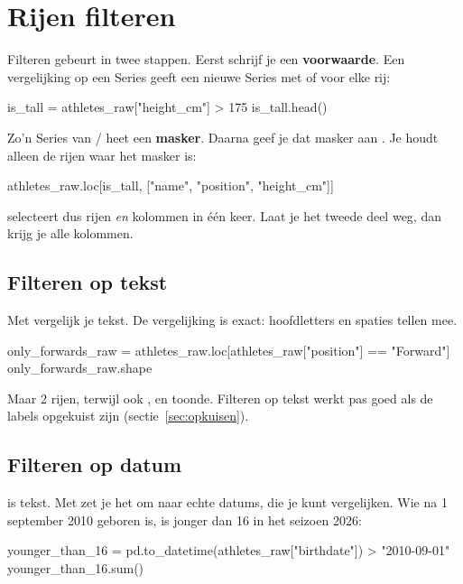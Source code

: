 \documentclass[11pt,a4paper]{article}
\begin{document}
\section{Rijen filteren}

Filteren gebeurt in twee stappen. Eerst schrijf je een
\textbf{voorwaarde}. Een vergelijking op een Series geeft een nieuwe
Series met  of  voor elke rij:

\begin{python}
is_tall = athletes_raw["height_cm"] > 175
is_tall.head()
\end{python}

Zo'n Series van / heet een \textbf{masker}. Daarna
geef je dat masker aan . Je houdt alleen de rijen waar
het masker  is:

\begin{python}
athletes_raw.loc[is_tall, ["name", "position", "height_cm"]]
\end{python}

 selecteert dus rijen \emph{en} kolommen in
één keer. Laat je het tweede deel weg, dan krijg je alle kolommen.

\subsection{Filteren op tekst}

Met \code{==} vergelijk je tekst. De vergelijking is exact: hoofdletters
en spaties tellen mee.

\begin{python}
only_forwards_raw = athletes_raw.loc[athletes_raw["position"] == "Forward"]
only_forwards_raw.shape
\end{python}

Maar 2 rijen, terwijl  ook ,
 en  toonde. Filteren op tekst werkt pas
goed als de labels opgekuist zijn (sectie~\ref{sec:opkuisen}).

\subsection{Filteren op datum}

 is tekst. Met  zet je het om naar
echte datums, die je kunt vergelijken. Wie na 1 september 2010 geboren
is, is jonger dan 16 in het seizoen 2026:

\begin{python}
younger_than_16 = pd.to_datetime(athletes_raw["birthdate"]) > "2010-09-01"
younger_than_16.sum()
\end{python}
\end{document}
